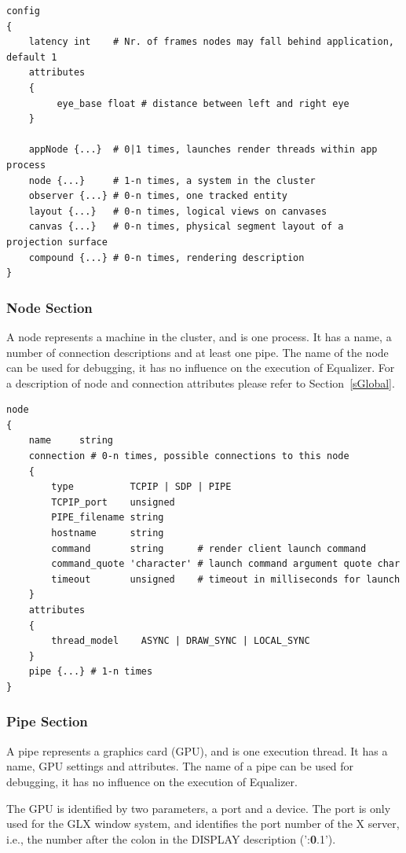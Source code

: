 \documentclass[10pt,a4]{scrartcl}
\newcommand{\sref}[1]{Section~\ref{#1}}
\begin{document}
{\footnotesize\begin{lstlisting}
config
{
    latency int    # Nr. of frames nodes may fall behind application, default 1
    attributes
    {
         eye_base float # distance between left and right eye
    }

    appNode {...}  # 0|1 times, launches render threads within app process
    node {...}     # 1-n times, a system in the cluster
    observer {...} # 0-n times, one tracked entity
    layout {...}   # 0-n times, logical views on canvases
    canvas {...}   # 0-n times, physical segment layout of a projection surface
    compound {...} # 0-n times, rendering description
}
\end{lstlisting}}

\subsubsection{Node Section}

A node represents a machine in the cluster, and is one process. It has a
name, a number of connection descriptions and at least one pipe. The
name of the node can be used for debugging, it has no influence on the
execution of Equalizer. For a description of node and connection
attributes please refer to \sref{sGlobal}.

{\footnotesize\begin{lstlisting}
node
{
    name     string
    connection # 0-n times, possible connections to this node
    {
        type          TCPIP | SDP | PIPE
        TCPIP_port    unsigned
        PIPE_filename string
        hostname      string
        command       string      # render client launch command
        command_quote 'character' # launch command argument quote char
        timeout       unsigned    # timeout in milliseconds for launch
    }
    attributes
    {
        thread_model    ASYNC | DRAW_SYNC | LOCAL_SYNC
    }
    pipe {...} # 1-n times
}
\end{lstlisting}}

\subsubsection{Pipe Section}

A pipe represents a graphics card (GPU), and is one execution thread. It
has a name, GPU settings and attributes. The name of a pipe can be used
for debugging, it has no influence on the execution of Equalizer.

The GPU is identified by two parameters, a port and a device. The port
is only used for the GLX window system, and identifies the port number
of the X server, i.e., the number after the colon in the DISPLAY
description (':\textbf{0}.1').
\end{document}
